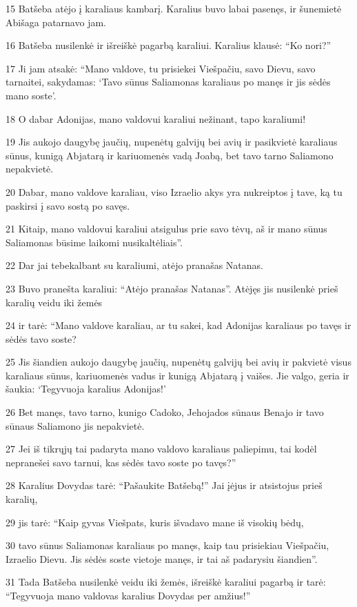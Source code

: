 \par 15 Batšeba atėjo į karaliaus kambarį. Karalius buvo labai pasenęs, ir šunemietė Abišaga patarnavo jam. 
\par 16 Batšeba nusilenkė ir išreiškė pagarbą karaliui. Karalius klausė: “Ko nori?” 
\par 17 Ji jam atsakė: “Mano valdove, tu prisiekei Viešpačiu, savo Dievu, savo tarnaitei, sakydamas: ‘Tavo sūnus Saliamonas karaliaus po manęs ir jis sėdės mano soste’. 
\par 18 O dabar Adonijas, mano valdovui karaliui nežinant, tapo karaliumi! 
\par 19 Jis aukojo daugybę jaučių, nupenėtų galvijų bei avių ir pasikvietė karaliaus sūnus, kunigą Abjatarą ir kariuomenės vadą Joabą, bet tavo tarno Saliamono nepakvietė. 
\par 20 Dabar, mano valdove karaliau, viso Izraelio akys yra nukreiptos į tave, ką tu paskirsi į savo sostą po savęs. 
\par 21 Kitaip, mano valdovui karaliui atsigulus prie savo tėvų, aš ir mano sūnus Saliamonas būsime laikomi nusikaltėliais”. 
\par 22 Dar jai tebekalbant su karaliumi, atėjo pranašas Natanas. 
\par 23 Buvo pranešta karaliui: “Atėjo pranašas Natanas”. Atėjęs jis nusilenkė prieš karalių veidu iki žemės 
\par 24 ir tarė: “Mano valdove karaliau, ar tu sakei, kad Adonijas karaliaus po tavęs ir sėdės tavo soste? 
\par 25 Jis šiandien aukojo daugybę jaučių, nupenėtų galvijų bei avių ir pakvietė visus karaliaus sūnus, kariuomenės vadus ir kunigą Abjatarą į vaišes. Jie valgo, geria ir šaukia: ‘Tegyvuoja karalius Adonijas!’ 
\par 26 Bet manęs, tavo tarno, kunigo Cadoko, Jehojados sūnaus Benajo ir tavo sūnaus Saliamono jis nepakvietė. 
\par 27 Jei iš tikrųjų tai padaryta mano valdovo karaliaus paliepimu, tai kodėl nepranešei savo tarnui, kas sėdės tavo soste po tavęs?” 
\par 28 Karalius Dovydas tarė: “Pašaukite Batšebą!” Jai įėjus ir atsistojus prieš karalių, 
\par 29 jis tarė: “Kaip gyvas Viešpats, kuris išvadavo mane iš visokių bėdų, 
\par 30 tavo sūnus Saliamonas karaliaus po manęs, kaip tau prisiekiau Viešpačiu, Izraelio Dievu. Jis sėdės soste vietoje manęs, ir tai aš padarysiu šiandien”. 
\par 31 Tada Batšeba nusilenkė veidu iki žemės, išreiškė karaliui pagarbą ir tarė: “Tegyvuoja mano valdovas karalius Dovydas per amžius!” 
